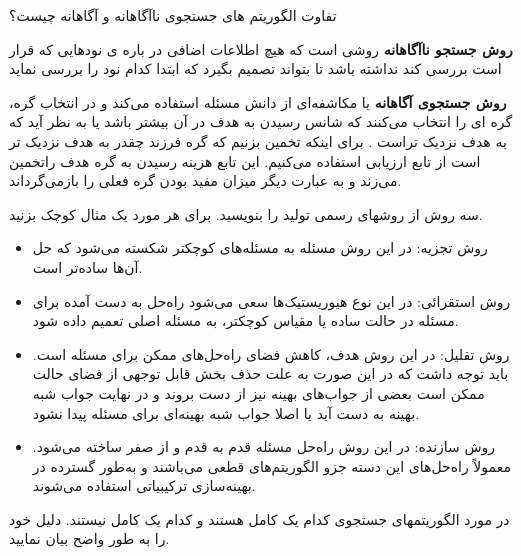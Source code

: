 \documentclass[12pt]{article}
\begin{document}
\vspace{20pt}
\noindent
تفاوت الگوریتم های جستجوی ناآگاهانه و آگاهانه چیست؟


\begin{tcolorbox}
\textbf{ روش جستجو ناآگاهانه }
 روشی است که هیچ اطلاعات اضافی در باره ی نودهایی که قرار است بررسی کند نداشته باشد تا بتواند تصمیم بگیرد که ابتدا کدام نود را بررسی نماید
 
 \textbf{ روش جستجوی آگاهانه }
 یا مکاشفه‌ای از دانش مسئله استفاده می‌کند و در انتخاب گره، گره ای را انتخاب می‌کنند که شانس رسیدن به هدف در آن بیشتر باشد یا به نظر آید که به هدف نزدیک تراست . برای اینکه تخمین بزنیم که گره فرزند چقدر به هدف نزدیک تر است از تابع ارزیابی استفاده می‌کنیم. این تابع هزینه رسیدن به گره هدف راتخمین می‌زند و به عبارت دیگر میزان مفید بودن گره فعلی را بازمی‌گرداند. 
\end{tcolorbox}






\newpage
\vspace{20pt}
\noindent
سه روش از روشهای رسمی تولید 
 را بنویسید. برای هر مورد یک مثال کوچک بزنید.




\begin{tcolorbox}
\begin{itemize}
	\item روش تجزیه: در این روش مسئله به مسئله‌های کوچکتر شکسته می‌شود که حل آن‌ها ساده‌تر است.
	\item روش استقرائی: در این نوع هیوریستیک‌ها سعی می‌شود راه‌حل به دست آمده برای مسئله در حالت ساده یا مقیاس کوچکتر، به مسئله اصلی تعمیم داده شود.
	\item روش تقلیل: در این روش‌ هدف، کاهش فضای راه‌حل‌های ممکن برای مسئله است. باید توجه داشت که در این صورت به علت حذف بخش قابل توجهی از فضای حالت ممکن است بعضی از جواب‌های بهینه نیز از دست بروند و در نهایت جواب شبه بهینه به دست آید یا اصلا جواب شبه بهینه‌ای برای مسئله پیدا نشود.
	\item روش سازنده: در این روش راه‌حل مسئله قدم به قدم و از صفر ساخته می‌شود. معمولاً راه‌حل‌های این دسته جزو الگوریتم‌های قطعی می‌باشند و به‌طور گسترده در بهینه‌سازی ترکیبیاتی استفاده می‌شوند.
\end{itemize}
\end{tcolorbox}






\vspace{20pt}
\noindent
در مورد الگوریتمهای جستجوی 
کدام یک کامل هستند و کدام یک کامل نیستند. دلیل خود را به طور واضح بیان نمایید.
\end{document}
